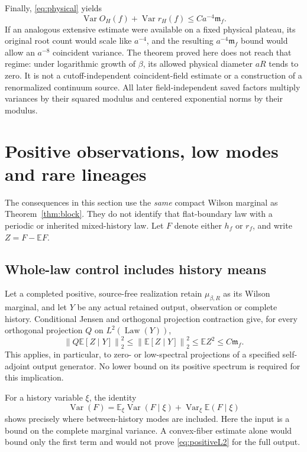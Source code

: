 \documentclass[11pt,letterpaper]{article}
\numberwithin{equation}{section}
\theoremstyle{definition}\newtheorem{definition}[theorem]{Definition}
\theoremstyle{remark}\newtheorem{remark}[theorem]{Remark}
\newcommand{\E}{\mathbb E}\newcommand{\Var}{\operatorname{Var}}
\newcommand{\mf}{\mathfrak m_f}\newcommand{\eps}{\varepsilon}
\newcommand{\norm}[1]{\left\lVert #1\right\rVert}
\newcommand{\Law}{\operatorname{Law}}
\begin{document}
Finally, \eqref{eq:physical} yields
\[
 \Var O_H(f)+\Var r_H(f)\le Ca^{-4}\mf.
\]
If an analogous extensive estimate were available on a fixed physical plateau, its original root count would scale like $a^{-4}$, and the resulting $a^{-4}\mf$ bound would allow an $a^{-8}$ coincident variance. The theorem proved here does not reach that regime: under logarithmic growth of $\beta$, its allowed physical diameter $aR$ tends to zero. It is not a cutoff-independent coincident-field estimate or a construction of a renormalized continuum source. All later field-independent saved factors multiply variances by their squared modulus and centered exponential norms by their modulus.

\section{Positive observations, low modes and rare lineages}
\label{sec:positive}

The consequences in this section use the \emph{same} compact Wilson marginal as Theorem~\ref{thm:block}. They do not identify that flat-boundary law with a periodic or inherited mixed-history law. Let $F$ denote either $h_f$ or $r_f$, and write $Z=F-\E F$.

\subsection{Whole-law control includes history means}

Let a completed positive, source-free realization retain $\mu_{\beta,R}$ as its Wilson marginal, and let $Y$ be any actual retained output, observation or complete history. Conditional Jensen and orthogonal projection contraction give, for every orthogonal projection $Q$ on $L^2(\Law(Y))$,
\begin{equation}
 \norm{Q\E[Z\mid Y]}_2^2\le\norm{\E[Z\mid Y]}_2^2
 \le\E Z^2\le C\mf.
 \label{eq:positiveL2}
\end{equation}
This applies, in particular, to zero- or low-spectral projections of a specified self-adjoint output generator. No lower bound on its positive spectrum is required for this implication.

For a history variable $\xi$, the identity
\begin{equation}
 \Var(F)=\E_\xi\Var(F\mid\xi)
       +\Var_\xi\E(F\mid\xi)
 \label{eq:historyvariance}
\end{equation}
shows precisely where between-history modes are included. Here the input is a bound on the complete marginal variance. A convex-fiber estimate alone would bound only the first term and would not prove \eqref{eq:positiveL2} for the full output.
\end{document}
